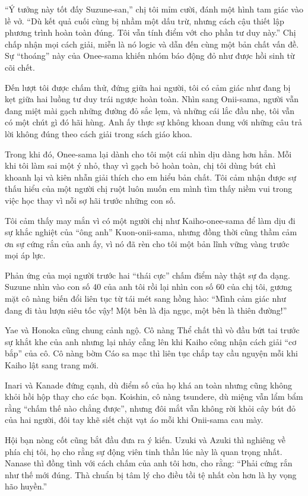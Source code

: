 \documentclass[../main.tex]{subfiles}
\begin{document}
``Ý tưởng này tốt đấy Suzune-san,'' chị tôi mỉm cười, đánh một hình tam giác vào lề vở. ``Dù kết quả cuối cùng bị nhầm một dấu trừ, nhưng cách cậu thiết lập phương trình hoàn toàn đúng. Tôi vẫn tính điểm vớt cho phần tư duy này.'' Chị chấp nhận mọi cách giải, miễn là nó logic và dẫn đến cùng một bản chất vấn đề. Sự ``thoáng'' này của Onee-sama khiến nhóm báo động đỏ như được hồi sinh từ cõi chết.

Đến lượt tôi được chấm thử, đứng giữa hai người, tôi có cảm giác như đang bị kẹt giữa hai luồng tư duy trái ngược hoàn toàn. Nhìn sang Onii-sama, người vẫn đang miệt mài gạch những đường đỏ sắc lẹm, và những cái lắc đầu nhẹ, tôi vẫn có một chút gì đó hãi hùng. Anh ấy thực sự không khoan dung với những câu trả lời không đúng theo cách giải trong sách giáo khoa.

Trong khi đó, Onee-sama lại dành cho tôi một cái nhìn dịu dàng hơn hẳn. Mỗi khi tôi làm sai một ý nhỏ, thay vì gạch bỏ hoàn toàn, chị tôi dùng bút chì khoanh lại và kiên nhẫn giải thích cho em hiểu bản chất. Tôi cảm nhận được sự thấu hiểu của một người chị ruột luôn muốn em mình tìm thấy niềm vui trong việc học thay vì nỗi sợ hãi trước những con số.

Tôi cảm thấy may mắn vì có một người chị như Kaiho-onee-sama để làm dịu đi sự khắc nghiệt của ``ông anh'' Kuon-onii-sama, nhưng đồng thời cũng thầm cảm ơn sự cứng rắn của anh ấy, vì nó đã rèn cho tôi một bản lĩnh vững vàng trước mọi áp lực.

Phản ứng của mọi người trước hai ``thái cực'' chấm điểm này thật sự đa dạng. Suzune nhìn vào con số 40 của anh tôi rồi lại nhìn con số 60 của chị tôi, gương mặt cô nàng biến đổi liên tục từ tái mét sang hồng hào: ``Mình cảm giác như đang đi tàu lượn siêu tốc vậy! Một bên là địa ngục, một bên là thiên đường!''

Yae và Honoka cũng chung cảnh ngộ. Cô nàng Thể chất thì vò đầu bứt tai trước sự khắt khe của anh nhưng lại nhảy cẫng lên khi Kaiho công nhận cách giải ``cơ bắp'' của cô. Cô nàng bờm Cáo sa mạc thì liên tục chắp tay cầu nguyện mỗi khi Kaiho lật sang trang mới.

Inari và Kanade đứng cạnh, dù điểm số của họ khá an toàn nhưng cũng không khỏi hồi hộp thay cho các bạn. Koishin, cô nàng tsundere, dù miệng vẫn lẩm bẩm rằng ``chấm thế nào chẳng được'', nhưng đôi mắt vẫn không rời khỏi cây bút đỏ của hai người, đôi tay khẽ siết chặt vạt áo mỗi khi Onii-sama cau mày.

Hội bạn nòng cốt cũng bắt đầu đưa ra ý kiến. Uzuki và Azuki thì nghiêng về phía chị tôi, họ cho rằng sự động viên tinh thần lúc này là quan trọng nhất. Nanase thì đồng tình với cách chấm của anh tôi hơn, cho rằng: ``Phải cứng rắn như thế mới đúng. Thà chuẩn bị tâm lý cho điều tồi tệ nhất còn hơn là hy vọng hão huyền.''
\end{document}
